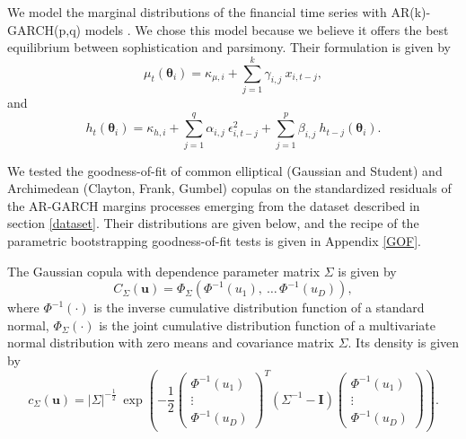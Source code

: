 We model the marginal distributions of the financial time series
with AR(k)-GARCH(p,q) models \citep{bollerslev86}. We chose this
model because we believe it offers the best equilibrium between
sophistication and parsimony. Their formulation is given by
\begin{equation}
\label{drift}
    \mu_t(\boldsymbol\theta_i)=\kappa_{\mu,i}+ \sum_{j=1}^k \gamma_{i,j} \
    x_{i,t-j},
\end{equation}
and
\begin{equation}
\label{volatility}
    h_t(\boldsymbol\theta_i)=\kappa_{h,i} + \sum_{j=1}^q \alpha_{i,j} \ \epsilon_{i,t-j}^2 +  \sum_{j=1}^p \beta_{i,j} \
    h_{t-j}(\boldsymbol\theta_i).
\end{equation}

We tested the goodness-of-fit of common elliptical (Gaussian and
Student) and Archimedean (Clayton, Frank, Gumbel)  copulas on the
standardized residuals of the AR-GARCH margins processes emerging
from the dataset described in section \ref{dataset}. Their
distributions are given below, and the recipe of the parametric
bootstrapping goodness-of-fit tests is given in Appendix \ref{GOF}.

The Gaussian copula with dependence parameter matrix $\Sigma$ is given by
\begin{equation}
\label{gaussiancopuladist}
C_{\Sigma}(\mathbf{u})=\Phi_{\Sigma}\left(\Phi^{-1}(u_1), \ \ldots
\, \Phi^{-1}(u_D)\right),
\end{equation}
where $\Phi^{-1}(\cdot)$ is the inverse cumulative distribution function of a standard normal, $\Phi_{\Sigma}(\cdot)$ is the joint
cumulative distribution function of a multivariate normal distribution with zero means and covariance matrix $\Sigma$. Its density is given by
\begin{displaymath}
c_{\Sigma}(\mathbf{u})=\left| \Sigma \right|^{-\frac{1}{2}} \
\exp\left(-\frac{1}{2}  \left(\begin{array}{c} \Phi^{-1}(u_1)\\
\vdots \\  \Phi^{-1}(u_D) \end{array}  \right)^T
(\Sigma^{-1}-\mathbf{I}) \left(\begin{array}{c} \Phi^{-1}(u_1)\\
\vdots \\  \Phi^{-1}(u_D) \end{array}  \right)\right).
\end{displaymath}

